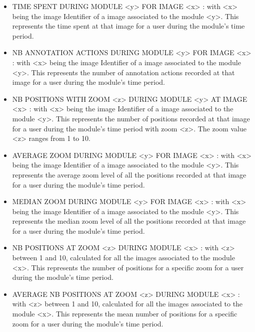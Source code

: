 \documentclass[a4paper,11pt]{report}
\numberwithin{figure}{section} %
\begin{document}
\begin{itemize}
    \item[\textbullet] TIME SPENT DURING MODULE <y> FOR IMAGE <x> : with <x> being the image Identifier of a image associated to the module <y>.
    This represents the time spent at that image for a user during the module's time period. \\
    
    \item[\textbullet] NB ANNOTATION ACTIONS DURING MODULE <y> FOR IMAGE <x> : with <x> being the image Identifier of a image associated to the module <y>.
    This represents the number of annotation actions recorded at that image for a user during the module's time period. \\
     
     
     \item[\textbullet] NB POSITIONS WITH ZOOM <z> DURING MODULE <y> AT IMAGE <x> : with <x> being the image Identifier of a image associated to the module <y>.
     This represents the number of positions recorded at that image for a user during the module's time period with zoom <z>.
     The zoom value <z> ranges from 1 to 10. \\
     
     \item[\textbullet] AVERAGE ZOOM DURING MODULE <y> FOR IMAGE <x> : with <x> being the image Identifier of a image associated to the module <y>.
     This represents the average zoom level of all the positions recorded at that image for a user during the module's time period. \\
     
     \item[\textbullet] MEDIAN ZOOM DURING MODULE <y> FOR IMAGE <x> : with <x> being the image Identifier of a image associated to the module <y>.
     This represents the median zoom level of all the positions recorded at that image for a user during the module's time period. \\
     
     \item[\textbullet] NB POSITIONS AT ZOOM <z> DURING MODULE <x> : with <z> between 1 and 10, calculated for all the images associated to the module <x>.
     This represents the number of positions for a specific zoom for a user during the module's time period. \\
     
	\item[\textbullet] AVERAGE NB POSITIONS AT ZOOM <z> DURING MODULE <x> : with <z> between 1 and 10, calculated for all the images associated to the module <x>.
	This represents the mean number of positions for a specific zoom for a user during the module's time period. \\


\end{itemize}
\end{document}
